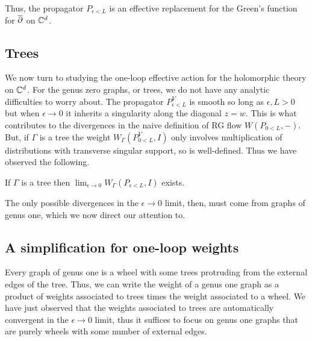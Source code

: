 \documentclass[11pt]{amsart}
\begin{document}
\begin{rmk}
Thus, the propagator $P_{\epsilon <L}$ is an effective replacement for the Green's function for $\overline{\partial}$ on $\mathbb C^d$. 

\end{rmk}

\subsection{Trees}

We now turn to studying the one-loop effective action for the holomorphic theory on $\mathbb C^d$. 
For the genus zero graphs, or trees, we do not have any analytic difficulties to worry about. 
The propagator $P_{\epsilon<L}^V$ is smooth so long as $\epsilon,L > 0$ but when $\epsilon \to 0$ it inherits a singularity along the diagonal $z = w$.
This is what contributes to the divergences in the naive definition of RG flow $W(P_{0<L}, -)$.
But, if $\Gamma$ is a tree the weight $W_\Gamma(P_{0<L}^V, I)$ only involves multiplication of distributions with transverse singular support, so is well-defined.
Thus we have observed the following.

\begin{lem} 
If $\Gamma$ is a tree then $\lim_{\epsilon \to 0} W_{\Gamma}(P_{\epsilon < L}, I)$ exists.
\end{lem}

The only possible divergences in the $\epsilon \to 0$ limit, then, must come from graphs of genus one, which we now direct our attention to.

\subsection{A simplification for one-loop weights}

Every graph of genus one is a wheel with some trees protruding from the external edges of the tree.
Thus, we can write the weight of a genus one graph as a product of weights associated to trees times the weight associated to a wheel.
We have just observed that the weights associated to trees are automatically convergent in the $\epsilon \to 0$ limit, thus it suffices to focus on genus one graphs that are purely wheels with some number of external edges.
\end{document}

